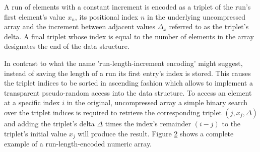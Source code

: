     \begin{figure}[ht]
      \centering
      \captionsetup{width=0.9\columnwidth}
      
      \label{fig:rli-encoding}
    \end{figure}

    A run of elements with a constant increment is encoded as a triplet of the run's first element's value $x_n$, its
    positional index $n$ in the underlying uncompressed array and the increment between adjacent values $\Delta_x$
    referred to as the triplet's delta. A final triplet whose index is equal to the number of elements in the array
    designates the end of the data structure.

    In contrast to what the name 'run-length-increment encoding' might suggest, instead of saving the length of a run
    its first entry's index is stored. This causes the triplet indices to be sorted in ascending fashion which allows to
    implement a transparent pseudo-random access into the data structure. To access an element at a specific index $i$
    in the original, uncompressed array a simple binary search over the triplet indices is required to retrieve the
    corresponding triplet $(j, x_j, \Delta)$ and adding the triplet's delta $\Delta$ times the index's remainder $(i-j)$
    to the triplet's initial value $x_j$ will produce the result. Figure \ref{fig:rli-encoding-example} shows a
    complete example of a run-length-encoded numeric array.

    \begin{figure}[ht]
      \centering
      \captionsetup{width=0.9\columnwidth}
      
      \label{fig:rli-encoding-example}
    \end{figure}

